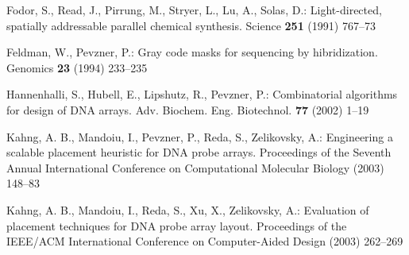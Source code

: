 \documentclass{llncs}
\begin{document}
\begin{thebibliography}{99}

 Fodor, S., Read, J., Pirrung, M., Stryer, L., Lu, A., Solas, D.:
Light-directed, spatially addressable parallel chemical synthesis.
Science {\bfseries 251} (1991) 767--73

 Feldman, W., Pevzner, P.:
Gray code masks for sequencing by hibridization.
Genomics {\bfseries23} (1994) 233--235

 Hannenhalli, S., Hubell, E., Lipshutz, R., Pevzner, P.:
Combinatorial algorithms for design of DNA arrays.
Adv. Biochem. Eng. Biotechnol. {\bfseries77} (2002) 1--19

 Kahng, A. B., Mandoiu, I., Pevzner, P., Reda, S., Zelikovsky, A.:
Engineering a scalable placement heuristic for DNA probe arrays.
Proceedings of the Seventh Annual International Conference on Computational Molecular Biology (2003) 148--83

 Kahng, A. B., Mandoiu, I., Reda, S., Xu, X., Zelikovsky, A.:
Evaluation of placement techniques for DNA probe array layout.
Proceedings of the IEEE/ACM International Conference on Computer-Aided Design (2003) 262--269
 
\end{thebibliography}
\end{document}
